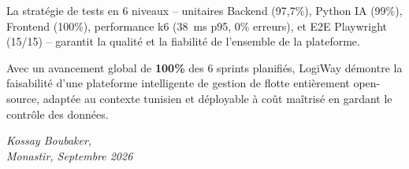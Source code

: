 \documentclass[12pt,a4paper]{report}
\begin{document}
La stratégie de tests en 6 niveaux -- unitaires Backend (97,7\%),
Python IA (99\%), Frontend (100\%), performance k6 (38~ms p95, 0\% erreurs),
et E2E Playwright (15/15) -- garantit la qualité et la fiabilité
de l'ensemble de la plateforme.

Avec un avancement global de \textbf{100\%} des 6 sprints planifiés,
LogiWay démontre la faisabilité d'une plateforme intelligente de gestion
de flotte entièrement open-source, adaptée au contexte tunisien et
déployable à coût maîtrisé en gardant le contrôle des données.

\medskip
\begin{flushright}
  \textit{Kossay Boubaker,}\\
  \textit{Monastir, Septembre 2026}
\end{flushright}

\newpage
\end{document}
